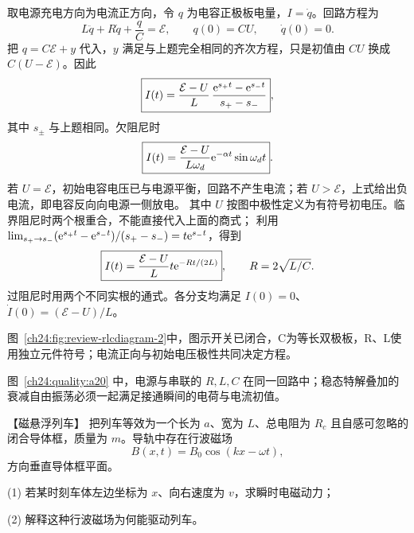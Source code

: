 {\begin{xesolution}
取电源充电方向为电流正方向，令 $q$ 为电容正极板电量，$I=\dot q$。回路方程为
\begin{equation}
  L\ddot q+R\dot q+\frac qC=\mathcal E,
  \qquad q(0)=CU,
  \qquad \dot q(0)=0.
\end{equation}
把 $q=C\mathcal E+y$ 代入，$y$ 满足与上题完全相同的齐次方程，只是初值由 $CU$ 换成 $C(U-\mathcal E)$。因此
\begin{equation}
  \boxed{I(t)=\frac{\mathcal E-U}{L}\,
  \frac{\mathrm e^{s_+t}-\mathrm e^{s_-t}}{s_+-s_-}},
\end{equation}
其中 $s_\pm$ 与上题相同。欠阻尼时
\begin{equation}
  \boxed{I(t)=\frac{\mathcal E-U}{L\omega_d}
  \mathrm e^{-\alpha t}\sin\omega_dt}.
\end{equation}
若 $U=\mathcal E$，初始电容电压已与电源平衡，回路不产生电流；若 $U>\mathcal E$，上式给出负电流，即电容反向向电源一侧放电。
其中 $U$ 按图中极性定义为有符号初电压。临界阻尼时两个根重合，不能直接代入上面的商式；
利用 $\lim_{s_+\to s_-}(\mathrm e^{s_+t}-\mathrm e^{s_-t})/(s_+-s_-)=t\mathrm e^{s_-t}$，得到
\begin{equation}
 \boxed{I(t)=\frac{\mathcal E-U}{L}t\mathrm e^{-Rt/(2L)}},\qquad R=2\sqrt{L/C}.
\end{equation}
过阻尼时用两个不同实根的通式。各分支均满足 $I(0)=0$、$\dot I(0)=(\mathcal E-U)/L$。

图~\ref{ch24:fig:review-rlcdiagram-2}中，图示开关已闭合，C为等长双极板，R、L使用独立元件符号；电流正向与初始电压极性共同决定方程。


图~\ref{ch24:quality:a20} 中，电源与串联的 $R,L,C$ 在同一回路中；稳态特解叠加的衰减自由振荡必须一起满足接通瞬间的电荷与电流初值。
\end{xesolution}



\begin{origexamplebox}{【磁悬浮列车】}\label{ch24:ex:s40-9-21}
把列车等效为一个长为 $a$、宽为 $L$、总电阻为 $R_c$ 且自感可忽略的闭合导体框，质量为 $m$。导轨中存在行波磁场
\begin{equation*}
  B(x,t)=B_0\cos(kx-\omega t),
\end{equation*}
方向垂直导体框平面。

(1) 若某时刻车体左边坐标为 $x$、向右速度为 $v$，求瞬时电磁动力；

(2) 解释这种行波磁场为何能驱动列车。
\begin{center}\end{center}


\end{origexamplebox}}
